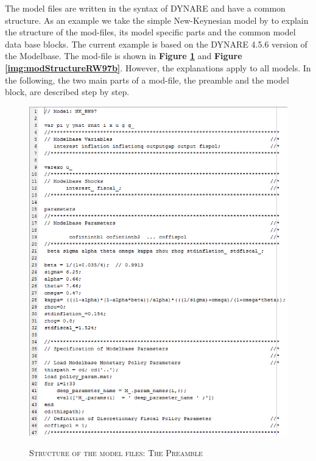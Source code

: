 The model files are written in the syntax of DYNARE and have a common structure.
As an example we take the simple New-Keynesian model by \cite{RotembergWoodford1997} to
explain the structure of the mod-files, its model specific parts and the common model data base blocks. The current example is based on the DYNARE 4.5.6 version of the Modelbase. The mod-file is shown in {\bf Figure \ref{img:modStructureRW97a}} and {\bf Figure \ref{img:modStructureRW97b}}. However, the explanations apply to all models.
In the following, the two main parts of a mod-file, the preamble and the model block, are described step by step.

\begin{figure}[H]
\centering
\caption{\textsc{Structure of the model files: The Preamble}}
\vspace{0.2cm}
\includegraphics[width=15cm,keepaspectratio]{modStructureRW97a.eps}\\
\label{img:modStructureRW97a}
\end{figure}

